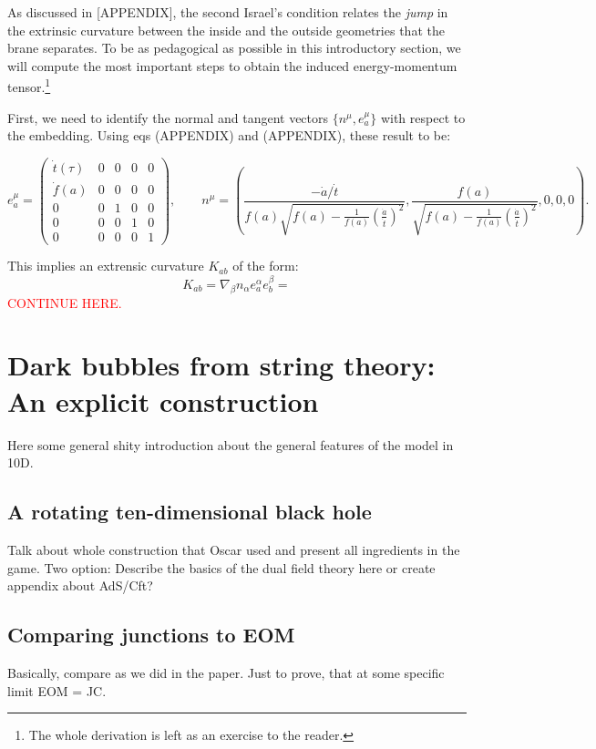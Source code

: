 \documentclass[12pt, a4paper]{article} %
\begin{document}
As discussed in [APPENDIX], the second Israel's condition relates the \textit{jump} in the extrinsic curvature between the inside and the outside geometries that the brane separates. To be as pedagogical as possible in this introductory section, we will compute the most important steps to obtain the induced energy-momentum tensor.\footnote{The whole derivation is left as an exercise to the reader.}

First, we need to identify the normal and tangent vectors $\{n^{\mu}, e^{\mu}_{a}\}$ with respect to the embedding. Using eqs (APPENDIX) and (APPENDIX),  these result to be:
\begin{small}
\begin{equation}
	e^{\mu}_{a} = \begin{pmatrix} \dot{t}(\tau) &0&0&0&0\\\dot{f}(a)&0&0&0&0\\0&0&1&0&0\\0&0&0&1&0\\0&0&0&0&1 \end{pmatrix}, \qquad n^{\mu} = \left(\frac{-\dot{a}/\dot{t}}{f(a)\sqrt{f(a) - \tfrac{1}{f(a)} \left(\tfrac{\dot{a}}{\dot{t}}\right)^{2}}}, \frac{f(a)}{\sqrt{f(a) - \tfrac{1}{f(a)} \left(\tfrac{\dot{a}}{\dot{t}}\right)^{2}}}, 0,0,0 \right).
\end{equation}
\end{small}
This implies an extrensic curvature $K_{ab}$ of the form:
\begin{equation}
	K_{ab} = \nabla_{\beta} n_{\alpha} e^{\alpha}_{a} e^{\beta}_{b} = 
\end{equation}
\textcolor{red}{CONTINUE HERE.}




\section{Dark bubbles from string theory: An explicit construction}
Here some general shity introduction about the general features of the model in 10D.
\subsection{A rotating ten-dimensional black hole}
Talk about whole construction that Oscar used and present all ingredients in the game. Two option: Describe the basics of the dual field theory here or create appendix about AdS/Cft?
\subsection{Comparing junctions to EOM}
Basically, compare as we did in the paper. Just to prove, that at some specific limit EOM = JC. 
\end{document}
